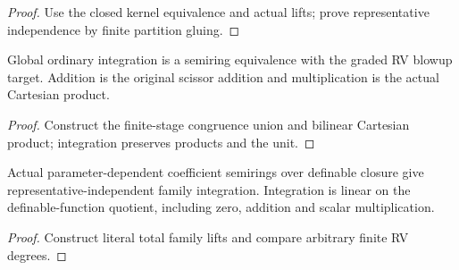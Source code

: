 \begin{proof}


\leanok

Use the closed kernel equivalence and actual lifts; prove representative independence by finite partition gluing.

\end{proof}

\begin{theorem}

\label{s6-19}


\leanok

Global ordinary integration is a semiring equivalence with the graded RV blowup target. Addition is the original scissor addition and multiplication is the actual Cartesian product.

\end{theorem}

\begin{proof}


\leanok

Construct the finite-stage congruence union and bilinear Cartesian product; integration preserves products and the unit.

\end{proof}

\begin{remark}

\label{s6-20}


\leanok

Actual parameter-dependent coefficient semirings over definable closure give representative-independent family integration. Integration is linear on the definable-function quotient, including zero, addition and scalar multiplication.

\end{remark}

\begin{proof}


\leanok

Construct literal total family lifts and compare arbitrary finite RV degrees.

\end{proof}

